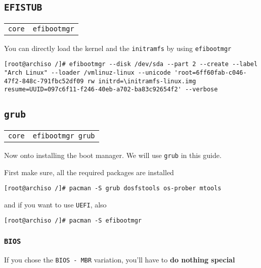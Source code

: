 \documentclass[9pt]{report}
\newenvironment{packagetable}
{\begin{longtabu}to \textwidth [b]{X[1,r]|X[1,l]}}
{\end{longtabu}}
\begin{document}
\newpage

\hypertarget{x-efistub}{\subsection{\texttt{EFISTUB}}}
\begin{packagetable}
    \texttt{core} & \texttt{efibootmgr} \\ 
\end{packagetable}

You can directly load the kernel and the \texttt{initramfs} by using \texttt{efibootmgr}


\begin{verbatim}
[root@archiso /]# efibootmgr --disk /dev/sda --part 2 --create --label "Arch Linux" --loader /vmlinuz-linux --unicode 'root=6ff60fab-c046-47f2-848c-791fbc52df09 rw initrd=\initramfs-linux.img resume=UUID=097c6f11-f246-40eb-a702-ba83c92654f2' --verbose
\end{verbatim}


\newpage

\hypertarget{x-grub}{\subsection{\texttt{grub}}}
\begin{packagetable}
    \texttt{core} & \texttt{efibootmgr grub} \\ 
\end{packagetable}

Now onto installing the boot manager.
We will use \texttt{grub} in this guide.


First make sure, all the required packages are installed


\begin{verbatim}
[root@archiso /]# pacman -S grub dosfstools os-prober mtools
\end{verbatim}

and if you want to use \texttt{UEFI}, also


\begin{verbatim}
[root@archiso /]# pacman -S efibootmgr
\end{verbatim}


\newpage

\hypertarget{x-bios}{\subsubsection{\texttt{BIOS}}}
If you chose the \texttt{BIOS - MBR} variation, you’ll have to \textbf{do nothing special}
\end{document}
